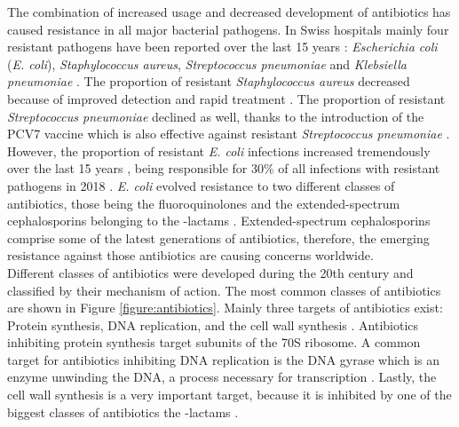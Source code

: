 The combination of increased usage and decreased development of antibiotics has caused resistance in all major bacterial pathogens. 
In Swiss hospitals mainly four resistant pathogens have been reported over the last 15 years \cite{swiss_hospitals}: \textit{Escherichia coli} (\textit{E. coli}), \textit{Staphylococcus aureus}, \textit{Streptococcus pneumoniae} and \textit{Klebsiella pneumoniae} \cite{swiss_hospitals}.
The proportion of resistant \textit{Staphylococcus aureus} decreased because of improved detection and rapid treatment \cite{swiss_hospitals}. The proportion of resistant \textit{Streptococcus pneumoniae} declined as well, thanks to the introduction of the PCV7 vaccine which is also effective against resistant \textit{Streptococcus pneumoniae} \cite{swiss_hospitals}. However, the proportion of resistant \textit{E. coli} infections increased tremendously over the last 15 years \cite{swiss_hospitals}, being responsible for 30\% of all infections with resistant pathogens in 2018 \cite{swiss_hospitals}. \textit{E. coli} evolved resistance to two different classes of antibiotics, those being the fluoroquinolones and the extended-spectrum cephalosporins belonging to the \textbeta-lactams \cite{swiss_hospitals}. Extended-spectrum cephalosporins comprise some of the latest generations of antibiotics, therefore, the emerging resistance against those antibiotics are causing concerns worldwide. \\ 
Different classes of antibiotics were developed during the 20th century and classified by their mechanism  of action. The most common classes of antibiotics are shown in Figure \ref{figure:antibiotics}. Mainly three targets of antibiotics exist: Protein synthesis, DNA replication, and the cell wall synthesis \cite{kapoor_action_2017}. Antibiotics inhibiting protein synthesis target subunits of the 70S ribosome. A common target for antibiotics inhibiting DNA replication is the DNA gyrase which is an enzyme unwinding the DNA, a process necessary for transcription \cite{kapoor_action_2017}.  
Lastly, the cell wall synthesis is a very important target, because it is inhibited by one of the biggest classes of antibiotics the \textbeta-lactams \cite{fisher_bacterial_2005}. 

